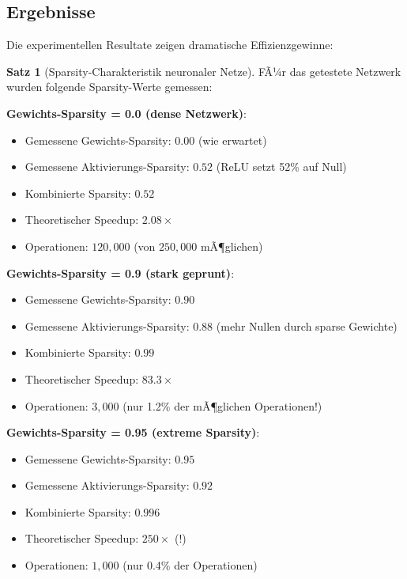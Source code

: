 ﻿\documentclass[a4paper,12pt]{report}
\theoremstyle{definition}
\newtheorem{satz}{Satz}
\begin{document}
	\subsection{Ergebnisse}
	
	Die experimentellen Resultate zeigen dramatische Effizienzgewinne:
	
	\begin{satz}[Sparsity-Charakteristik neuronaler Netze]
		FÃ¼r das getestete Netzwerk wurden folgende Sparsity-Werte gemessen:
		
		\textbf{Gewichts-Sparsity = 0.0 (dense Netzwerk)}:
		\begin{itemize}
			\item Gemessene Gewichts-Sparsity: $0.00$ (wie erwartet)
			\item Gemessene Aktivierungs-Sparsity: $0.52$ (ReLU setzt 52\% auf Null)
			\item Kombinierte Sparsity: $0.52$
			\item Theoretischer Speedup: $2.08\times$
			\item Operationen: $120{,}000$ (von $250{,}000$ mÃ¶glichen)
		\end{itemize}
		
		\textbf{Gewichts-Sparsity = 0.9 (stark geprunt)}:
		\begin{itemize}
			\item Gemessene Gewichts-Sparsity: $0.90$
			\item Gemessene Aktivierungs-Sparsity: $0.88$ (mehr Nullen durch sparse Gewichte)
			\item Kombinierte Sparsity: $0.99$
			\item Theoretischer Speedup: $83.3\times$
			\item Operationen: $3{,}000$ (nur 1.2\% der mÃ¶glichen Operationen!)
		\end{itemize}
		
		\textbf{Gewichts-Sparsity = 0.95 (extreme Sparsity)}:
		\begin{itemize}
			\item Gemessene Gewichts-Sparsity: $0.95$
			\item Gemessene Aktivierungs-Sparsity: $0.92$
			\item Kombinierte Sparsity: $0.996$
			\item Theoretischer Speedup: $250\times$ (!)
			\item Operationen: $1{,}000$ (nur 0.4\% der Operationen)
		\end{itemize}
	\end{satz}
	
\end{document}
